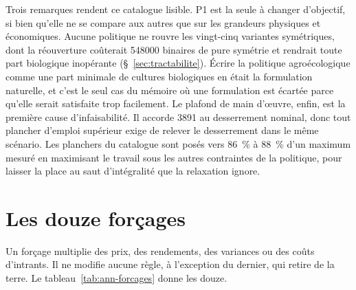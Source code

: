 Trois remarques rendent ce catalogue lisible. P1 est la seule à changer d'objectif, si bien
qu'elle ne se compare aux autres que sur les grandeurs physiques et économiques. Aucune
politique ne rouvre les vingt-cinq variantes symétriques, dont la réouverture coûterait
\num{548000} binaires de pure symétrie et rendrait toute part biologique inopérante
(§~\ref{sec:tractabilite}). Écrire la politique agroécologique comme une part minimale de
cultures biologiques en était la formulation naturelle, et c'est le seul cas du mémoire où une
formulation est écartée parce qu'elle serait satisfaite trop facilement. Le plafond de main
d'\oe uvre, enfin, est la première cause d'infaisabilité. Il accorde \SI{3891}{\etp} au
desserrement nominal, donc tout plancher d'emploi supérieur exige de relever le desserrement
dans le même scénario. Les planchers du catalogue sont posés vers \SI{86}{\percent} à
\SI{88}{\percent} d'un maximum mesuré en maximisant le travail sous les autres contraintes de
la politique, pour laisser la place au saut d'intégralité que la relaxation ignore.

\section{Les douze forçages}

Un forçage multiplie des prix, des rendements, des variances ou des coûts d'intrants. Il ne
modifie aucune règle, à l'exception du dernier, qui retire de la terre. Le
tableau~\ref{tab:ann-forcages} donne les douze.

